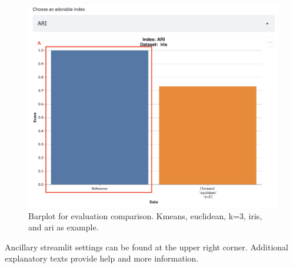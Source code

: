 \begin{figure}[H]
	\centering
	\includegraphics[width=\linewidth]{modules/web_frontend/eval_bar.png}
	\caption{Barplot for evaluation comparison. Kmeans, euclidean, k=3, iris, and \acrshort{ari} as example.}\label{fig:eval_bar}
\end{figure}


Ancillary streamlit settings can be found at the upper right corner. Additional explanatory texts provide help and more information. \\

